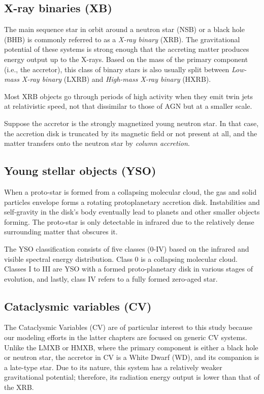 \subsection{X-ray binaries (XB)}

The main sequence star in orbit around a neutron star (NSB) or a black hole (BHB) is commonly referred to as a \emph{X-ray binary} (XRB). The gravitational potential of these systems is strong enough that the accreting matter produces energy output up to the X-rays. Based on the mass of the primary component (i.e., the accretor), this class of binary stars is also usually split between \emph{Low-mass X-ray binary} (LXRB) and \emph{High-mass X-ray binary} (HXRB). 

Most XRB objects go through periods of high activity when they emit twin jets at relativistic speed, not that dissimilar to those of AGN but at a smaller scale.

Suppose the accretor is the strongly magnetized young neutron star. In that case, the accretion disk is truncated by its magnetic field or not present at all, and the matter transfers onto the neutron star by \emph{column accretion}. 

\subsection{Young stellar objects (YSO)}
When a proto-star is formed from a collapsing molecular cloud, the gas and solid particles envelope forms a rotating protoplanetary accretion disk. Instabilities and self-gravity in the disk's body eventually lead to planets and other smaller objects forming. The proto-star is only detectable in infrared due to the relatively dense surrounding matter that obscures it.   

The YSO classification consists of five classes (0-IV) based on the infrared and visible spectral energy distribution. Class 0 is a collapsing molecular cloud. Classes I to III are YSO with a formed proto-planetary disk in various stages of evolution, and lastly, class IV refers to a fully formed zero-aged star. 

\subsection{Cataclysmic variables (CV)}

The Cataclysmic Variables (CV) are of particular interest to this study because our modeling efforts in the latter chapters are focused on generic CV systems. Unlike the LMXB or HMXB, where the primary component is either a black hole or neutron star, the accretor in CV is a White Dwarf (WD), and its companion is a late-type star. Due to its nature, this system has a relatively weaker gravitational potential; therefore, its radiation energy output is lower than that of the XRB.

